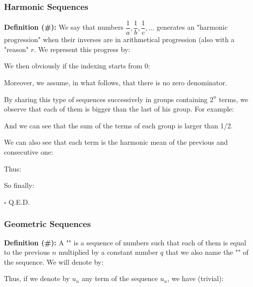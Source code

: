 	\pagebreak
	\subsubsection{Harmonic Sequences}

\textbf{Definition (\#\mydef):} We say that numbers $\dfrac{1}{a}, \dfrac{1}{b}, \dfrac{1}{c},...$ generates an "harmonic progression" when their inverses are in arithmetical progression (also with a "reason" $r$. We represent this progress by:
	
We then obviously if the indexing starts from 0:
	
Moreover, we assume, in what follows, that there is no zero denominator.

By sharing this type of sequences successively in groups containing $2^n$ terms, we observe that each of them is bigger than the last of his group. For example:
	
And we can see that the sum of the terms of each group is larger than 1/2.

We can also see that each term is the harmonic mean of the previous and consecutive one:

\begin{dem}
	
Thus:
	
So finally:
		
	\begin{flushright}
		$\square$  Q.E.D.
	\end{flushright}
\end{dem}

	\subsubsection{Geometric Sequences}
\textbf{Definition (\#\mydef):} A "" is a sequence of numbers such that each of them is equal to the previous $n$ multiplied by a constant number $q$ that we also name the "" of the sequence. We will denote by:
	
Thus, if we denote by $u_n$ any term of the sequence $u_n$, we have (trivial):
	
